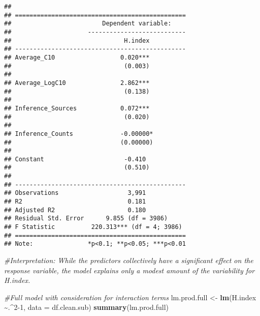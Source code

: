 \documentclass[
]{article}
\newenvironment{Shaded}{\begin{snugshade}}{\end{snugshade}}
\newcommand{\AttributeTok}[1]{\textcolor[rgb]{0.13,0.29,0.53}{#1}}
\newcommand{\CommentTok}[1]{\textcolor[rgb]{0.56,0.35,0.01}{\textit{#1}}}
\newcommand{\DecValTok}[1]{\textcolor[rgb]{0.00,0.00,0.81}{#1}}
\newcommand{\FunctionTok}[1]{\textcolor[rgb]{0.13,0.29,0.53}{\textbf{#1}}}
\newcommand{\NormalTok}[1]{#1}
\newcommand{\OtherTok}[1]{\textcolor[rgb]{0.56,0.35,0.01}{#1}}
\newcommand{\SpecialCharTok}[1]{\textcolor[rgb]{0.81,0.36,0.00}{\textbf{#1}}}
\begin{document}
\begin{verbatim}
## 
## ===============================================
##                         Dependent variable:    
##                     ---------------------------
##                               H.index          
## -----------------------------------------------
## Average_C10                  0.020***          
##                               (0.003)          
##                                                
## Average_LogC10               2.862***          
##                               (0.138)          
##                                                
## Inference_Sources            0.072***          
##                               (0.020)          
##                                                
## Inference_Counts             -0.00000*         
##                              (0.00000)         
##                                                
## Constant                      -0.410           
##                               (0.510)          
##                                                
## -----------------------------------------------
## Observations                   3,991           
## R2                             0.181           
## Adjusted R2                    0.180           
## Residual Std. Error      9.855 (df = 3986)     
## F Statistic          220.313*** (df = 4; 3986) 
## ===============================================
## Note:               *p<0.1; **p<0.05; ***p<0.01
\end{verbatim}

\begin{Shaded}
\begin{Highlighting}[]
\CommentTok{\#Interpretation: While the predictors collectively have a significant effect on the response variable, the model explains only a modest amount of the variability for H.index.}

\CommentTok{\#Full model with consideration for interaction terms}
\NormalTok{lm.prod.full }\OtherTok{\textless{}{-}} \FunctionTok{lm}\NormalTok{(H.index }\SpecialCharTok{\textasciitilde{}}\NormalTok{.}\SpecialCharTok{\^{}}\DecValTok{2{-}1}\NormalTok{, }\AttributeTok{data =}\NormalTok{ df.clean.sub)}
\FunctionTok{summary}\NormalTok{(lm.prod.full)}
\end{Highlighting}
\end{Shaded}
\end{document}
